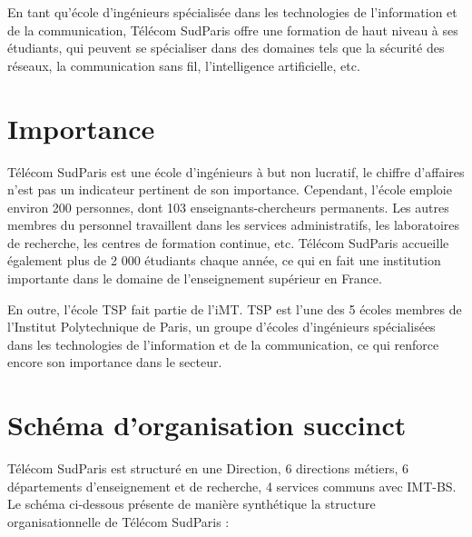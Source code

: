 \documentclass{report}
\begin{document}
{\hspace{1.6cm} En tant qu'école d'ingénieurs spécialisée dans les technologies de l'information et de la communication, Télécom SudParis offre une formation de haut niveau à ses étudiants, qui peuvent se spécialiser dans des domaines tels que la sécurité des réseaux, la communication sans fil, l'intelligence artificielle, etc.

\section{Importance }
\hspace{1.6cm}Télécom SudParis est une école d'ingénieurs à but non lucratif, le chiffre d'affaires n'est pas un indicateur pertinent de son importance. Cependant, l'école emploie environ 200 personnes, dont 103 enseignants-chercheurs permanents. Les autres membres du personnel travaillent dans les services administratifs, les laboratoires de recherche, les centres de formation continue, etc. Télécom SudParis accueille également plus de 2 000 étudiants chaque année, ce qui en fait une institution importante dans le domaine de l'enseignement supérieur en France.
\vspace*{0.5\baselineskip}

\hspace{1.6cm} En outre, l'école TSP fait partie de l'iMT. TSP est l'une des 5 écoles membres de l'Institut Polytechnique de Paris, un groupe d'écoles d'ingénieurs spécialisées dans les technologies de l'information et de la communication, ce qui renforce encore son importance dans le secteur.

\section{Schéma d'organisation succinct}
\hspace{1.6cm} Télécom SudParis est structuré en une Direction, 6 directions métiers, 6 départements d'enseignement et de recherche, 4 services communs avec IMT-BS. Le schéma ci-dessous présente de manière synthétique la structure organisationnelle de Télécom SudParis :
\newpage

}
\end{document}
